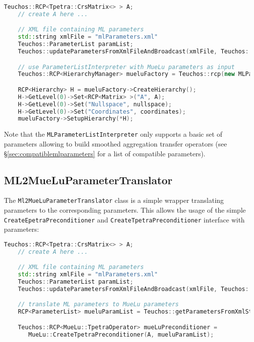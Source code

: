 \begin{lstlisting}[language=C++]
    Teuchos::RCP<Tpetra::CrsMatrix<> > A;
    // create A here ...

    // XML file containing ML parameters
    std::string xmlFile = "mlParameters.xml"
    Teuchos::ParameterList paramList;
    Teuchos::updateParametersFromXmlFileAndBroadcast(xmlFile, Teuchos::Ptr<Teuchos::ParameterList>(&paramList), *comm);

    // use ParameterListInterpreter with MueLu parameters as input
    Teuchos::RCP<HierarchyManager> mueluFactory = Teuchos::rcp(new MLParameterListInterpreter(*paramList));

    RCP<Hierarchy> H = mueluFactory->CreateHierarchy();
    H->GetLevel(0)->Set<RCP<Matrix> >("A", A);
    H->GetLevel(0)->Set("Nullspace", nullspace);
    H->GetLevel(0)->Set("Coordinates", coordinates);
    mueluFactory->SetupHierarchy(*H);
\end{lstlisting}

Note that the \texttt{MLParameterListInterpreter} only supports a basic set of \ml parameters allowing to build smoothed aggregation transfer operators (see \S\ref{sec:compatiblemlparameters} for a list of compatible \ml parameters).

\subsection{ML2MueLuParameterTranslator}

The \texttt{Ml2MueLuParameterTranslator} class is a simple wrapper translating \ml parameters to the corresponding \muelu parameters. This allows the usage of the simple \texttt{CreateEpetraPreconditioner} and \texttt{CreateTpetraPreconditioner} interface with \ml parameters:

\begin{lstlisting}[language=C++]
    Teuchos::RCP<Tpetra::CrsMatrix<> > A;
    // create A here ...

    // XML file containing ML parameters
    std::string xmlFile = "mlParameters.xml"
    Teuchos::ParameterList paramList;
    Teuchos::updateParametersFromXmlFileAndBroadcast(xmlFile, Teuchos::Ptr<Teuchos::ParameterList>(&paramList), *comm);

    // translate ML parameters to MueLu parameters
    RCP<ParameterList> mueluParamList = Teuchos::getParametersFromXmlString(MueLu::ML2MueLuParameterTranslator::translate(paramList,"SA"));

    Teuchos::RCP<MueLu::TpetraOperator> mueLuPreconditioner =
       MueLu::CreateTpetraPreconditioner(A, mueluParamList);
\end{lstlisting}

